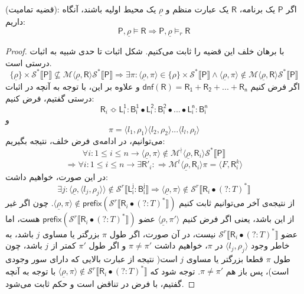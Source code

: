 \begin{thm}

	(قضیه تمامیت): اگر $\mathsf{P}$ یک برنامه، $\mathsf{R}$ یک عبارت منظم و $\underline{\rho}$ یک محیط اولیه باشند، آنگاه داریم:
$$\mathsf{P},\underline{\rho} \models \mathsf{R} \Rightarrow
\mathsf{P},\underline{\rho} \models_r \mathsf{R}$$
\end{thm}
\begin{proof}
	با برهان خلف این قضیه را ثابت می‌کنیم. شکل اثبات تا حدی شبیه به اثبات درستی است.
	$$\{\underline{\rho}\}\times \mathcal{S}^* \llbracket \mathsf{P} \rrbracket \nsubseteq \mathcal{M}\langle \underline{\rho}, \mathsf{R} \rangle \mathcal{S}^* \llbracket \mathsf{P} \rrbracket \Rightarrow
	\exists \pi:\langle \underline{\rho}, \pi \rangle \in \{\rho\}\times \mathcal{S}^* \llbracket \mathsf{P}\rrbracket \land \langle \underline{\rho}, \pi \rangle \notin \mathcal{M}\langle \underline{\rho},\mathsf{R}\rangle\mathcal{S}^* \llbracket \mathsf{P} \rrbracket$$
	اگر فرض کنیم
	$\mathsf{dnf(R)=R_1+R_2+...+R_n}$
	و علاوه بر این، با توجه به آنچه در اثبات درستی گفتیم، فرض کنیم:
	$$\mathsf{R}_i \Bumpeq \mathsf{L_i^1:B_i^1 \bullet L_i^2:B_i^2 \bullet ... \bullet L_i^n:B_i^n}$$ 
	و
	$$\pi=\langle l_1 ,\rho_1 \rangle \langle l_2 ,\rho_2 \rangle ... \langle l_l ,\rho_l \rangle$$
	می‌توانیم، در ادامه‌ی فرض خلف، نتیجه بگیریم:
	$$\forall i:1 \leq i \leq n \rightarrow 
	\langle \underline{\rho}, \pi \rangle \notin \mathcal{M}^\nmid \langle \underline{\rho}, \mathsf{R}_i \rangle \mathcal{S}^* \llbracket \mathsf{P} \rrbracket$$
	$$\Rightarrow\forall i:1 \leq i \leq n \rightarrow\exists \mathsf{R'}_i:\Rightarrow \mathcal{M}^t \langle \underline{\rho},\mathsf{R}_i \rangle \pi = \langle \mathit{F},\mathsf{R}_i^k \rangle$$
	در این صورت، خواهیم داشت:
	$$\exists j: \langle \underline{\rho},\langle l_j,\rho_j \rangle \rangle \notin \mathcal{S}^r \llbracket \mathsf{L_i^j:B_i^j} \rrbracket
	\Rightarrow \langle \underline{\rho},\pi \rangle \notin \mathcal {S}^r \llbracket \mathsf{R}_i \bullet (?:\mathit{T})^* \rrbracket$$
	از نتیجه‌ی آخر می‌توانیم ثابت کنیم 
	$\langle \underline{\rho},\pi \rangle \notin \mathsf{prefix}(\mathcal {S}^r \llbracket \mathsf{R}_i \bullet (?:\mathit{T})^* \rrbracket)$.
	چون اگر غیر از این باشد، یعنی اگر فرض کنیم 
	$\langle \underline{\rho}, \pi' \rangle$
	 عضو 
	 $\mathsf{prefix}(\mathcal {S}^r \llbracket \mathsf{R}_i \bullet (?:\mathit{T})^* \rrbracket)$
	 هست، اما عضو \break
	 $\mathcal {S}^r \llbracket \mathsf{R}_i \bullet (?:\mathit{T})^* \rrbracket$
	 نیست، در آن صورت، اگر طول $\pi$ بزرگتر یا مساوی $j$ باشد، به خاطر وجود 
	 $\langle l_j,\rho_j \rangle$
	 در $\pi$، خواهیم داشت $\pi \neq \pi'$ و اگر طول $\pi'$ کمتر از $j$ باشد، چون طول $\pi$ قطعا بزرگتر یا مساوی $j$ است( نتیجه از عبارت بالایی که دارای سور وجودی است)، پس باز هم 
	 $\pi \neq \pi'$.
	 توجه شود که 
	 $\langle \underline{\rho},\pi \rangle \notin \mathcal {S}^r \llbracket \mathsf{R}_i \bullet (?:\mathit{T})^* \rrbracket$
	 با توجه به آنچه گفتیم، با فرض در تناقض است و حکم ثابت می‌شود.
\end{proof}















